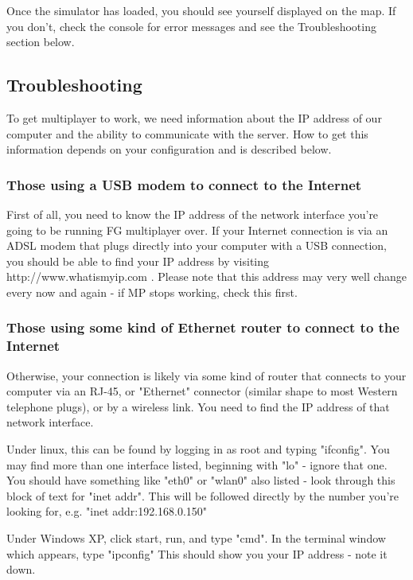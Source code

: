 Once the simulator has loaded, you should see yourself displayed on the map. If you don't, check the console for error messages and see the
Troubleshooting section below.

\subsection{Troubleshooting}

To get multiplayer to work, we need information about the IP address of our computer and the ability to communicate with the server. 
How to get this information depends on your configuration and is described below.


\subsubsection{Those using a USB modem to connect to the Internet}

First of all, you need to know the IP address of the network interface you're going to be running FG multiplayer over. 
If your Internet connection is via an ADSL modem that plugs directly into your computer with a USB connection, you 
should be able to find your IP address by visiting http://www.whatismyip.com . Please note that this address may very well 
change every now and again - if MP stops working, check this first.

\subsubsection{Those using some kind of Ethernet router to connect to the Internet}

Otherwise, your connection is likely via some kind of router that connects to your computer via an RJ-45, or "Ethernet" connector 
(similar shape to most Western telephone plugs), or by a wireless link. You need to find the IP address of that network interface.

Under linux, this can be found by logging in as root and typing "ifconfig". You may find more than one interface listed, 
beginning with "lo" - ignore that one. You should have something like "eth0" or "wlan0" also listed - look through this block 
of text for "inet addr". This will be followed directly by the number you're looking for, e.g. "inet addr:192.168.0.150"

Under Windows XP, click start, run, and type "cmd". In the terminal window which appears, type "ipconfig" 
This should show you your IP address - note it down.

